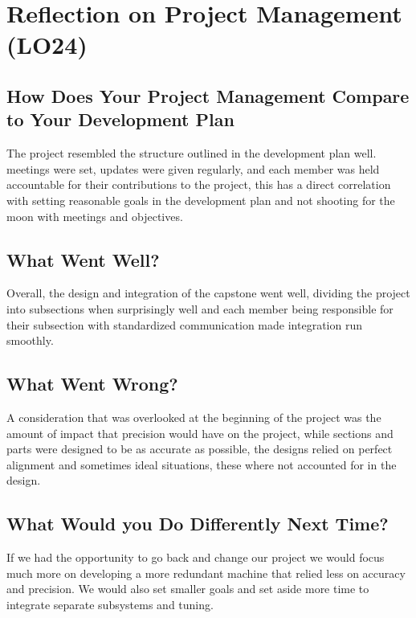 \documentclass{article}
\begin{document}
\section{Reflection on Project Management (LO24)}



\subsection{How Does Your Project Management Compare to Your Development Plan}


The project resembled the structure outlined in the development plan well. meetings were set, updates were given regularly, and each member was held accountable for their contributions to the project, this has a direct correlation with setting reasonable goals in the development plan and not shooting for the moon with meetings and objectives.

\subsection{What Went Well?}


Overall, the design and integration of the capstone went well, dividing the project into subsections when surprisingly well and each member being responsible for their subsection with standardized communication made integration run smoothly.

\subsection{What Went Wrong?}


A consideration that was overlooked at the beginning of the project was the amount of impact that precision would have on the project, while sections and parts were designed to be as accurate as possible, the designs relied on perfect alignment and sometimes ideal situations, these where not accounted for in the design.

\subsection{What Would you Do Differently Next Time?}


If we had the opportunity to go back and change our project we would focus much more on developing a more redundant machine that relied less on accuracy and precision. We would also set smaller goals and set aside more time to integrate separate subsystems and tuning.
\end{document}
